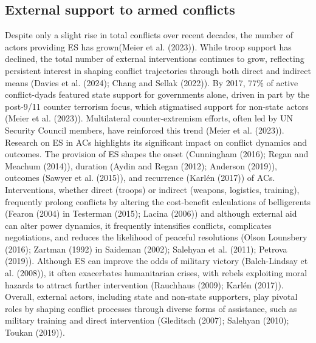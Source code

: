 \documentclass[
]{article}
\begin{document}
\subsection{External support to armed
conflicts}\label{external-support-to-armed-conflicts}

Despite only a slight rise in total conflicts over recent decades, the
number of actors providing ES has grown(Meier et al. (2023)). While
troop support has declined, the total number of external interventions
continues to grow, reflecting persistent interest in shaping conflict
trajectories through both direct and indirect means (Davies et al.
(2024); Chang and Sellak (2022)). By 2017, 77\% of active conflict-dyads
featured state support for governments alone, driven in part by the
post-9/11 counter terrorism focus, which stigmatised support for
non-state actors (Meier et al. (2023)). Multilateral counter-extremism
efforts, often led by UN Security Council members, have reinforced this
trend (Meier et al. (2023)). Research on ES in ACs highlights its
significant impact on conflict dynamics and outcomes. The provision of
ES shapes the onset (Cunningham (2016); Regan and Meachum (2014)),
duration (Aydin and Regan (2012); Anderson (2019)), outcomes (Sawyer et
al. (2015)), and recurrence (Karlén (2017)) of ACs. Interventions,
whether direct (troops) or indirect (weapons, logistics, training),
frequently prolong conflicts by altering the cost-benefit calculations
of belligerents (Fearon (2004) in Testerman (2015); Lacina (2006)) and
although external aid can alter power dynamics, it frequently
intensifies conflicts, complicates negotiations, and reduces the
likelihood of peaceful resolutions (Olson Lounsbery (2016); Zartman
(1992) in Saideman (2002); Salehyan et al. (2011); Petrova (2019)).
Although ES can improve the odds of military victory (Balch-Lindsay et
al. (2008)), it often exacerbates humanitarian crises, with rebels
exploiting moral hazards to attract further intervention (Rauchhaus
(2009); Karlén (2017)). Overall, external actors, including state and
non-state supporters, play pivotal roles by shaping conflict processes
through diverse forms of assistance, such as military training and
direct intervention (Gleditsch (2007); Salehyan (2010); Toukan (2019)).
\end{document}
